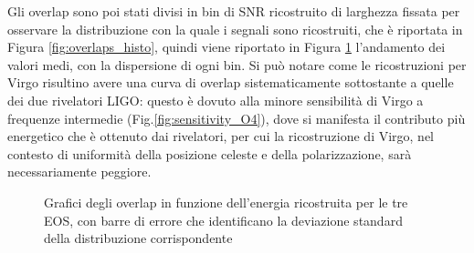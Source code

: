 Gli overlap sono poi stati divisi in bin di SNR ricostruito di larghezza fissata per osservare la distribuzione con la quale i segnali sono ricostruiti, che è riportata in Figura \ref{fig:overlaps_histo}, quindi viene riportato in Figura \ref{fig:Overlap_distribution} l'andamento dei valori medi, con la dispersione di ogni bin. Si può notare come le ricostruzioni per Virgo risultino avere una curva di overlap sistematicamente sottostante a quelle dei due rivelatori LIGO: questo è dovuto alla minore sensibilità di Virgo a frequenze intermedie (Fig.\ref{fig:sensitivity_O4}), dove si manifesta il contributo più energetico che è ottenuto dai rivelatori, per cui la ricostruzione di Virgo, nel contesto di uniformità della posizione celeste e della polarizzazione, sarà necessariamente peggiore.
\begin{figure}[hbt!]
	\centering
	\caption{Grafici degli overlap in funzione dell'energia ricostruita per le tre EOS, con barre di errore che identificano la deviazione standard della distribuzione corrispondente}
	\label{fig:Overlap_distribution}
\end{figure}
